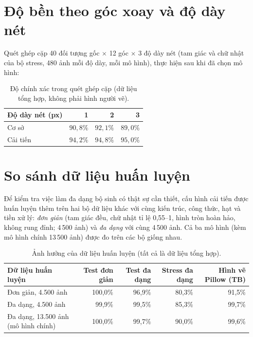 \section{Độ bền theo góc xoay và độ dày nét}
Quét ghép cặp 40 đối tượng gốc $\times$ 12 góc $\times$ 3 độ dày nét (tam giác và chữ nhật của bộ stress, 480 ảnh mỗi độ dày, mỗi mô hình), thực hiện sau khi đã chọn mô hình:
\begin{table}[H]\centering
\begin{tabular}{lrrr}
\toprule
Độ dày nét (px) & 1 & 2 & 3 \\
\midrule
Cơ sở & $90{,}8\%$ & $92{,}1\%$ & $89{,}0\%$ \\
Cải tiến & $94{,}2\%$ & $94{,}8\%$ & $95{,}0\%$ \\
\bottomrule
\end{tabular}
\caption{Độ chính xác trong quét ghép cặp (dữ liệu tổng hợp, không phải hình người vẽ).}
\end{table}


\section{So sánh dữ liệu huấn luyện}
\label{muc:sosanhdulieu}
Để kiểm tra việc làm đa dạng bộ sinh có thật sự cần thiết, cấu hình cải tiến được huấn luyện thêm trên hai bộ dữ liệu khác với cùng kiến trúc, công thức, hạt và tiền xử lý:
\emph{đơn giản} (tam giác đều, chữ nhật tỉ lệ 0,55--1, hình tròn hoàn hảo, không rung đỉnh; 4\,500 ảnh) và \emph{đa dạng} với cùng 4\,500 ảnh. Cả ba mô hình (kèm mô hình chính 13\,500 ảnh) được đo trên các bộ giống nhau.

\begin{table}[H]\centering\small
\begin{tabular}{lrrrr}
\toprule
Dữ liệu huấn luyện & Test đơn giản & Test đa dạng & Stress đa dạng & Hình vẽ Pillow (TB) \\
\midrule
Đơn giản, 4.500 ảnh & 100,0\% & 96,9\% & 80,3\% & 91,5\% \\
Đa dạng, 4.500 ảnh & 99,9\% & 99,5\% & 85,3\% & 99,7\% \\
Đa dạng, 13.500 ảnh (mô hình chính) & 100,0\% & 99,7\% & 90,0\% & 99,6\% \\
\bottomrule
\end{tabular}
\caption{Ảnh hưởng của dữ liệu huấn luyện (tất cả là dữ liệu tổng hợp).}
\end{table}


